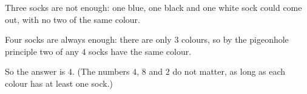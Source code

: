 Three socks are not enough: one blue, one black and one white sock could come out, with no two of the same colour.

Four socks are always enough: there are only $3$ colours, so by the pigeonhole principle two of any $4$ socks have the same colour.

So the answer is $\boxed{4}$. (The numbers $4$, $8$ and $2$ do not matter, as long as each colour has at least one sock.)
